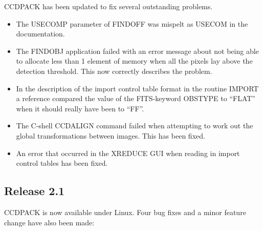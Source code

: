 \documentclass[twoside,11pt]{article}
\newcommand{\htmlref}[2]{#1}
\renewcommand{\_}{\texttt{\symbol{95}}}
\newcommand{\xroutine}[1]{\htmlref{{\sc #1}}{#1}}
\begin{document}
CCDPACK has been updated to fix several outstanding problems.
\begin{itemize}

\item The USECOMP parameter of \xroutine{FINDOFF} was mispelt as USECOM in the
documentation.

\item   The \xroutine{FINDOBJ} application failed with an error message about not
   being able to allocate less than 1 element of memory when all
   the pixels lay above the detection threshold. This now correctly
   describes the problem.

\item   In the description of the import control table format in the
   routine \xroutine{IMPORT} a reference compared the value of the FITS-keyword
   OBSTYPE to ``FLAT'' when it should really have been to ``FF''.

\item   The C-shell \xroutine{CCDALIGN} command failed when attempting to work out the
   global transformations between images. This has been fixed.

\item    An error that occurred in the \xroutine{XREDUCE} GUI when reading in import
   control tables has been fixed.
\end{itemize}

\subsection{Release 2.1}

 CCDPACK is now available under Linux. Four bug fixes and a minor feature
 change have also been made:
\end{document}
